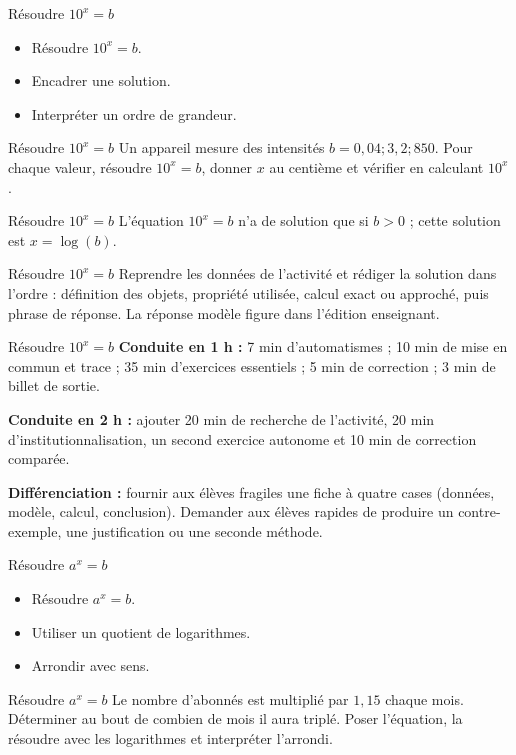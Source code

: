 \documentclass[aspectratio=169,10pt]{beamer}
\begin{document}
\begin{frame}{Résoudre \(10^x=b\)}
\begin{itemize}
\item Résoudre \(10^x=b\).
\item Encadrer une solution.
\item Interpréter un ordre de grandeur.

\end{itemize}
\end{frame}
\begin{frame}{Résoudre \(10^x=b\)}
Un appareil mesure des intensités \(b=0{,}04;3{,}2;850\). Pour chaque valeur, résoudre \(10^x=b\), donner \(x\) au centième et vérifier en calculant \(10^x\).
\end{frame}
\begin{frame}{Résoudre \(10^x=b\)}
L'équation \(10^x=b\) n'a de solution que si \(b>0\) ; cette solution est \(x=\log(b)\).
\end{frame}
\begin{frame}{Résoudre \(10^x=b\)}
Reprendre les données de l'activité et rédiger la solution dans l'ordre : définition des objets, propriété utilisée, calcul exact ou approché, puis phrase de réponse. La réponse modèle figure dans l'édition enseignant.
\end{frame}
\begin{frame}{Résoudre \(10^x=b\)}
\textbf{Conduite en 1 h :} 7 min d'automatismes ; 10 min de mise en commun et trace ; 35 min d'exercices essentiels ; 5 min de correction ; 3 min de billet de sortie.

\textbf{Conduite en 2 h :} ajouter 20 min de recherche de l'activité, 20 min d'institutionnalisation, un second exercice autonome et 10 min de correction comparée.

\textbf{Différenciation :} fournir aux élèves fragiles une fiche à quatre cases (données, modèle, calcul, conclusion). Demander aux élèves rapides de produire un contre-exemple, une justification ou une seconde méthode.
\end{frame}
\begin{frame}{Résoudre \(a^x=b\)}
\begin{itemize}
\item Résoudre \(a^x=b\).
\item Utiliser un quotient de logarithmes.
\item Arrondir avec sens.

\end{itemize}
\end{frame}
\begin{frame}{Résoudre \(a^x=b\)}
Le nombre d'abonnés est multiplié par \(1{,}15\) chaque mois. Déterminer au bout de combien de mois il aura triplé. Poser l'équation, la résoudre avec les logarithmes et interpréter l'arrondi.
\end{frame}
\end{document}
